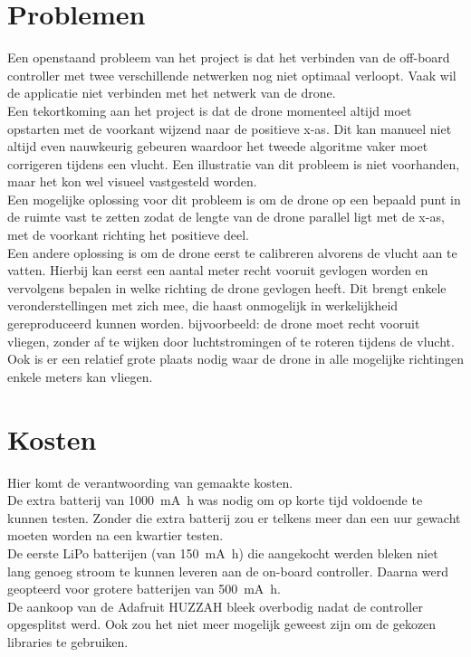 \section{Problemen} \label{sec:problems}
Een openstaand probleem van het project is dat het verbinden van de off-board controller met twee verschillende netwerken nog niet optimaal verloopt. Vaak wil de applicatie niet verbinden met het netwerk van de drone.\\

Een tekortkoming aan het project is dat de drone momenteel altijd moet opstarten met de voorkant wijzend naar de positieve x-as.
Dit kan manueel niet altijd even nauwkeurig gebeuren waardoor het tweede algoritme vaker moet corrigeren tijdens een vlucht.
Een illustratie van dit probleem is niet voorhanden, maar het kon wel visueel vastgesteld worden.\\
Een mogelijke oplossing voor dit probleem is om de drone op een bepaald punt in de ruimte vast te zetten zodat de lengte van de drone parallel ligt met de x-as, met de voorkant richting het positieve deel.\\
Een andere oplossing is om de drone eerst te calibreren alvorens de vlucht aan te vatten.
Hierbij kan eerst een aantal meter recht vooruit gevlogen worden en vervolgens bepalen in welke richting de drone gevlogen heeft.
Dit brengt enkele veronderstellingen met zich mee, die haast onmogelijk in werkelijkheid gereproduceerd kunnen worden.
bijvoorbeeld: de drone moet recht vooruit vliegen, zonder af te wijken door luchtstromingen of te roteren tijdens de vlucht.
Ook is er een relatief grote plaats nodig waar de drone in alle mogelijke richtingen enkele meters kan vliegen.\\

\section{Kosten}
Hier komt de verantwoording van gemaakte kosten.\\
De extra batterij van \SI{1000}{\mA\hour} was nodig om op korte tijd voldoende te kunnen testen.
Zonder die extra batterij zou er telkens meer dan een uur gewacht moeten worden na een kwartier testen.\\
De eerste LiPo batterijen (van \SI{150}{\mA\hour}) die aangekocht werden bleken niet lang genoeg stroom te kunnen leveren aan de on-board controller.
Daarna werd geopteerd voor grotere batterijen van \SI{500}{\mA\hour}.\\
De aankoop van de Adafruit HUZZAH bleek overbodig nadat de controller opgesplitst werd. Ook zou het niet meer mogelijk geweest zijn om de gekozen libraries te gebruiken.\\

